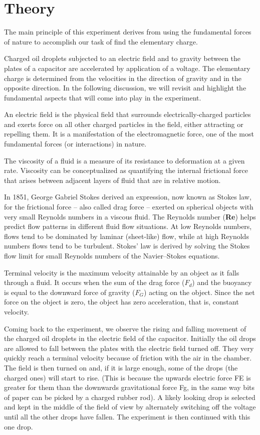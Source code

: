 \documentclass[%
 reprint,
 amsmath,amssymb,
 aps,
]{revtex4-2}
\begin{document}
\section{Theory}
    The main principle of this experiment derives from using the fundamental forces of nature to accomplish our task of find the elementary charge.
    \par
    Charged oil droplets subjected to an electric field and to gravity between the plates of a capacitor are accelerated by application of a voltage. The elementary charge is determined from the velocities in the direction of gravity and in the opposite direction. In the following discussion, we will revisit and highlight the fundamental aspects that will come into play in the experiment.
    \par
    An electric field is the physical field that surrounds electrically-charged particles and exerts force on all other charged particles in the field, either attracting or repelling them. It is a manifestation of the electromagnetic force, one of the most fundamental forces (or interactions) in nature.
    \par
    The viscosity of a fluid is a measure of its resistance to deformation at a given rate. Viscosity can be conceptualized as quantifying the internal frictional force that arises between adjacent layers of fluid that are in relative motion.
    \par 
    In 1851, George Gabriel Stokes derived an expression, now known as Stokes law, for the frictional force – also called drag force – exerted on spherical objects with very small Reynolds numbers in a viscous fluid. The Reynolds number (\textbf{Re}) helps predict flow patterns in different fluid flow situations. At low Reynolds numbers, flows tend to be dominated by laminar (sheet-like) flow, while at high Reynolds numbers flows tend to be turbulent. Stokes' law is derived by solving the Stokes flow limit for small Reynolds numbers of the Navier–Stokes equations.
    \par
    Terminal velocity is the maximum velocity attainable by an object as it falls through a fluid. It occurs when the sum of the drag force ($F_d$) and the buoyancy is equal to the downward force of gravity ($F_G$) acting on the object. Since the net force on the object is zero, the object has zero acceleration, that is, constant velocity.
    \par
    Coming back to the experiment, we observe the rising and falling movement of the charged oil droplets in the electric field of the capacitor. Initially the oil drops are allowed to fall between the plates with the electric field turned off. They very quickly reach a terminal velocity because of friction with the air in the chamber. The field is then turned on and, if it is large enough, some of the drops (the charged ones) will start to rise. (This is because the upwards electric force FE is greater for them than the downwards gravitational force Fg, in the same way bits of paper can be picked by a charged rubber rod). A likely looking drop is selected and kept in the middle of the field of view by alternately switching off the voltage until all the other drops have fallen. The experiment is then continued with this one drop.
\end{document}
